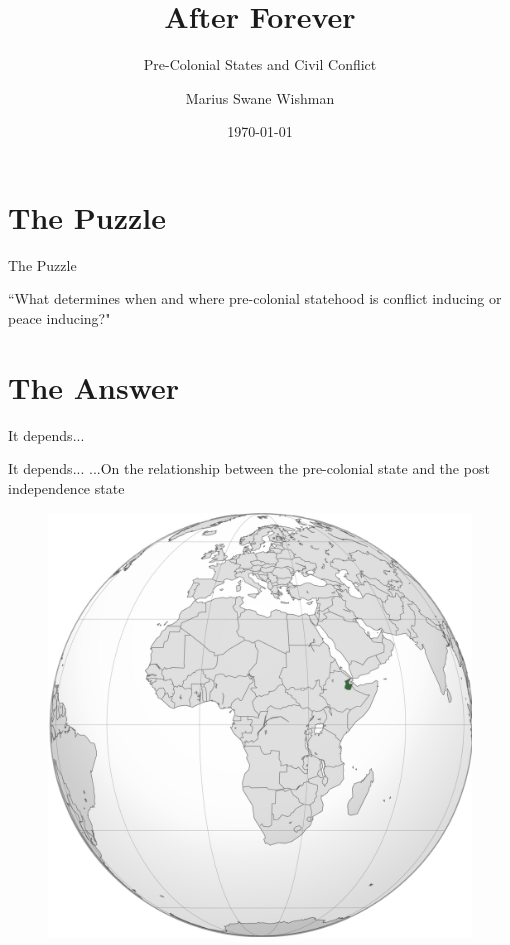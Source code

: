 \documentclass{beamer}
\title[ISA 2023]{After Forever}
\subtitle{Pre-Colonial States and Civil Conflict}
\author[Wishman]{Marius Swane Wishman}
\date{\today}
\institute{NTNU}
\begin{document}
\begin{frame}[plain]
\titlepage 
\end{frame}

\section{The Puzzle}

\begin{frame}
	\centering
	\Large The Puzzle
\end{frame}

\begin{frame} 
	\centering
	\Large ``What determines when and where pre-colonial
	statehood is conflict inducing or peace inducing?"

\end{frame}

\section{The Answer}

\begin{frame} 
	\centering
	\Large It depends...
\end{frame}

\begin{frame}{It depends...}
	\centering
	\Large ...On the relationship between the pre-colonial state and the
	post independence state
\end{frame}

\begin{frame}
	\begin{figure}
		\includegraphics[width=.7\linewidth]{img/aussa.png}
	\end{figure}
\end{frame}
\end{document}

